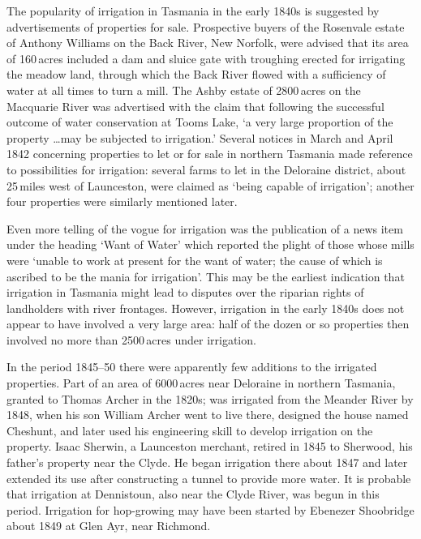 The popularity of irrigation in Tasmania in the early 1840s is
suggested by advertisements of properties for sale.  Prospective
buyers of the Rosenvale estate of Anthony Williams
on the Back River, New Norfolk, were advised that
its area of 160\,acres included a dam and sluice gate with troughing
erected for irrigating the meadow land, through which the Back River
flowed with a sufficiency of water at all times to turn a mill.  The
Ashby estate of 2800\,acres on the Macquarie
River was advertised with the claim that
following the successful outcome of water conservation at Tooms
Lake, `a very large proportion of the property
\ldots may be subjected to irrigation.'  Several notices in March and
April 1842 concerning properties to let or for sale in northern
Tasmania made reference to possibilities for irrigation: several farms
to let in the Deloraine district, about 25\,miles
west of Launceston, were claimed as `being capable of irrigation';
another four properties were similarly mentioned
later.

Even more telling of the vogue for irrigation was the publication of a
news item under the heading `Want of Water' which reported the plight
of those whose mills were `unable to work at present for the want of
water; the cause of which is ascribed to be the mania for
irrigation'.  This may
be the earliest indication that irrigation in Tasmania might lead to
disputes over the riparian rights of landholders with river frontages.
However, irrigation in the early 1840s does not appear to have
involved a very large area: half of the dozen or so properties then
involved no more than 2500\,acres under irrigation.

In the period 1845--50 there were apparently few additions to the
irrigated properties.  Part of an area of 6000\,acres near Deloraine in
northern Tasmania, granted to Thomas Archer in the
1820s; was irrigated from the Meander River by
1848, when his son William Archer went to live
there, designed the house named Ches\-hunt, and later used his
engineering skill to develop irrigation on the property.  Isaac
Sherwin, a Launceston merchant, retired in 1845 to
Sherwood, his father's property near the Clyde.  He began irrigation
there about 1847 and later extended its use after constructing a
tunnel to provide more water.  It is probable that irrigation at
Dennistoun, also near the Clyde River,
 was begun in
this period.  Irrigation for hop-growing may have been
started by Ebenezer Shoobridge about 1849 at
Glen Ayr, near Richmond.

